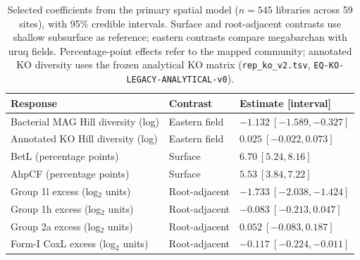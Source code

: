 \begin{table}[htbp]\centering\small
\caption{Selected coefficients from the primary spatial model ($n=545$ libraries across 59 sites), with 95\% credible intervals. Surface and root-adjacent contrasts use shallow subsurface as reference; eastern contrasts compare megabarchan with uruq fields. Percentage-point effects refer to the mapped community; annotated KO diversity uses the frozen analytical KO matrix (\texttt{rep\_\allowbreak ko\_\allowbreak v2.tsv}, \texttt{EQ-\allowbreak KO-\allowbreak LEGACY-\allowbreak ANALYTICAL-\allowbreak v0}).}\label{tab:mag_spatial}
\begin{tabular}{lll}\toprule
Response & Contrast & Estimate [interval]\\\midrule
Bacterial MAG Hill diversity (log) & Eastern field & $-1.132\ [-1.589,-0.327]$\\
Annotated KO Hill diversity (log) & Eastern field & $0.025\ [-0.022,0.073]$\\
BetL (percentage points) & Surface & $6.70\ [5.24,8.16]$\\
AhpCF (percentage points) & Surface & $5.53\ [3.84,7.22]$\\
Group 1l excess (log$_2$ units) & Root-adjacent & $-1.733\ [-2.038,-1.424]$\\
Group 1h excess (log$_2$ units) & Root-adjacent & $-0.083\ [-0.213,0.047]$\\
Group 2a excess (log$_2$ units) & Root-adjacent & $0.052\ [-0.083,0.187]$\\
Form-I CoxL excess (log$_2$ units) & Root-adjacent & $-0.117\ [-0.224,-0.011]$\\\bottomrule
\end{tabular}
\end{table}

